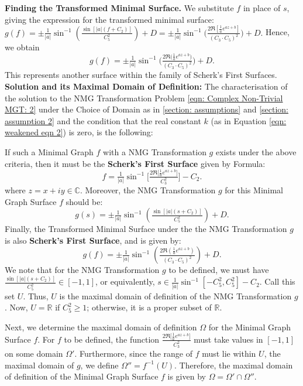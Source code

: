 \documentclass[12pt]{article}
\theoremstyle{plain}
\theoremstyle{definition}
\theoremstyle{remark}
\begin{document}
\textbf{Finding the Transformed Minimal Surface.}  
We substitute \(f\) in place of \(s\), giving the expression for the transformed minimal surface:  
\(g(f) = \pm \frac{1}{|a|}\sin^{-1}\!\left(\frac{\sin[|a|(f + C_2)]}{C_5^2}\right) + D 
= \pm \frac{1}{|a|}\sin^{-1}\!\Big(\frac{2\Re\left[\frac{1}{a} e^{az + b}\right]}{(C_3 \cdot C_5)^2}\Big) + D.\) Hence, we obtain  
\[
\boxed{g(f) = \pm \tfrac{1}{|a|}\sin^{-1}\Big(\tfrac{2\Re\big(\frac{1}{a} e^{az + b}\big)}{(C_3 \cdot C_5)^2}\Big) + D.}
\]
This represents another surface within the family of Scherk’s First Surfaces.\\

\textbf{Solution and its Maximal Domain of Definition:} 
The characterisation of the solution to the NMG Transformation Problem \ref{eqn: Complex Non-Trivial MGT: 2} under the Choice of Domain as in \ref{section: assumptions} and \ref{section: assumption 2} and the condition that the real constant $k$ (as in Equation \ref{eqn: weakened eqn 2}) is zero, is the following:

If such a Minimal Graph $f$ with a NMG Transformation $g$ exists under the above criteria, then it must be the \textbf{Scherk's First Surface} given by Formula:
\[
\boxed{f=\tfrac{1}{|a|} \sin^{-1}\Big[\tfrac{2\Re\big[\frac{1}{a} e^{a z + b}\big]}{C_3^2}\Big]-C_2}.
\]
where \(z=x+iy\in\mathbb{C}\). Moreover, the NMG Transformation $g$ for this Minimal Graph Surface \(f\) should be:
\[
\boxed{g(s) = \pm \tfrac{1}{|a|}\sin^{-1}\left(\tfrac{\sin[|a|(s + C_2)]}{C_5^2}\right) + D.}
\]
Finally, the Transformed Minimal Surface under the the NMG Transformation $g$  is also  \textbf{Scherk's First Surface}, and is given by: 
\[
  \boxed{g(f) = \pm \tfrac{1}{|a|}\sin^{-1}\left(\tfrac{2\Re\left(\tfrac{1}{a} e^{az + b}\right)}{(C_3 \cdot C_5)^2}\right) + D.}
\]
We note that for the NMG Transformation $g$ to be defined, we must have \(\tfrac{\sin[|a|(s + C_2)]}{C_5^2} \in [-1,1]\), or equivalently, \(s \in \tfrac{1}{|a|}\sin^{-1}[-C_5^2, C_5^2] - C_2\). Call this set \(U\). Thus, \(U\) is the maximal domain of definition of the NMG Transformation $g$. Now, \(U = \mathbb{R}\) if \(C_5^2 \geq 1\); otherwise, it is a proper subset of \(\mathbb{R}\).

Next, we determine the maximal domain of definition \(\Omega\) for the Minimal Graph Surface \(f\). For \(f\) to be defined, the function \(\frac{2\Re\big[\frac{1}{a} e^{a z + b}\big]}{C_3^2}\) must take values in \([-1,1]\) on some domain \(\Omega'\). Furthermore, since the range of \(f\) must lie within \(U\), the maximal domain of \(g\), we define \(\Omega'' = f^{-1}(U)\). Therefore, the maximal domain of definition of the Minimal Graph Surface \(f\) is given by \(\Omega = \Omega' \cap \Omega''.\) 
\end{document}

